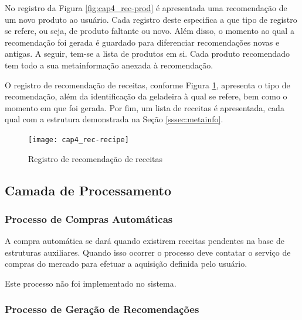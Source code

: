 No registro da Figura \ref{fig:cap4_rec-prod} é apresentada uma recomendação de um novo produto ao usuário. Cada registro deste especifica a que tipo de registro se refere, ou seja, de produto faltante ou novo. Além disso, o momento ao qual a recomendação foi gerada é guardado para diferenciar recomendações novas e antigas. A seguir, tem-se a lista de produtos em si. Cada produto recomendado tem todo a sua metainformação anexada à recomendação.


O registro de recomendação de receitas, conforme Figura \ref{fig:cap4_rec-recipe}, apresenta o tipo de recomendação, além da identificação da geladeira à qual se refere, bem como o momento em que foi gerada. Por fim, um lista de receitas é apresentada, cada qual com a estrutura demonstrada na Seção \ref{sssec:metainfo}.

\begin{figure}[H]
    \caption{Registro de recomendação de receitas}
    \label{fig:cap4_rec-recipe}
    \texttt{[image: cap4\_rec-recipe]}
\end{figure}


\subsection{Camada de Processamento}


\subsubsection{Processo de Compras Automáticas}

A compra automática se dará quando existirem receitas pendentes na base de estruturas auxiliares. Quando isso ocorrer o processo deve contatar o serviço de compras do mercado para efetuar a aquisição definida pelo usuário.

Este processo não foi implementado no sistema.

\subsubsection{Processo de Geração de Recomendações} \label{sssec:proc_ger_rec}

